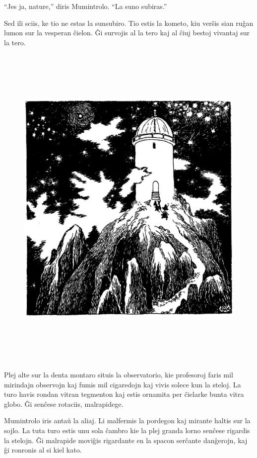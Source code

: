 ``Jes ja, nature,'' diris Mumintrolo. ``La suno subiras.''

Sed ili sciis, ke tio ne estas la sunsubiro. Tio estis la kometo, kiu verŝis sian ruĝan lumon sur la vesperan ĉielon. Ĝi survojis al la tero kaj al ĉiuj bestoj vivantaj sur la tero.
\sectionbreak

\begin{figure}[htbp]
\centering
\includegraphics[width=443pt,height=462pt]{4-5.png}
\caption{}
\label{4-5}
\end{figure}

Plej alte sur la denta montaro situis la observatorio, kie profesoroj faris mil mirindajn observojn kaj fumis mil cigaredojn kaj vivis solece kun la steloj. La turo havis rondan vitran tegmenton kaj estis ornamita per ĉielarke bunta vitra globo. Ĝi senĉese rotaciis, malrapidege.

Mumintrolo iris antaŭ la aliaj. Li malfermis la pordegon kaj mirante haltis sur la sojlo. La tuta turo estis unu sola ĉambro kie la plej granda lorno senĉese rigardis la stelojn. Ĝi malrapide moviĝis rigardante en la spacon serĉante danĝerojn, kaj ĝi ronronis al si kiel kato.

